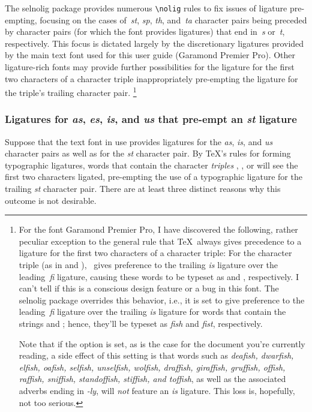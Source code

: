 \documentclass[11pt]{article}
\newcommand{\pkg}[1]{\textsf{#1}}
\newcommand{\opt}[1]{\uselig{\texttt{#1}}}
\newcommand{\cmmd}[1]{\texttt{\textbackslash #1}}
\begin{document}
\enlargethispage{0.5\baselineskip}

The \pkg{selnolig} package provides numerous \cmmd{nolig} rules to fix issues of ligature pre-empting, focusing on the cases of~\emph{st}, \emph{sp}, \emph{th}, and~\emph{ta} character pairs being preceded by character pairs (for which the font provides ligatures) that end in~\emph{s} or~\emph{t}, respectively. This focus is dictated largely by the discretionary ligatures provided by the main text font used for this user guide (Garamond Premier Pro). Other ligature-rich fonts may provide further possibilities for the ligature for the first two characters of a character triple inappropriately pre-empting the ligature for the triple's trailing character pair.%
\footnote{For the font Garamond Premier Pro, I have discovered the following, rather peculiar exception to the general rule that \TeX\ always gives precedence to a ligature for the first two characters of a character triple: For the character triple \opt{fis} (as in \opt{fist} and \opt{fish}), \LuaTeX\ gives preference to the trailing \emph{is} ligature over the leading\, \emph{fi} ligature, causing these words to be typeset as \emph{} and \emph{}, respectively. I can't tell if this is a conscious design feature or a bug in this font. The \pkg{selnolig} package overrides this behavior, i.e., it is set to give preference to the leading\, \emph{fi} ligature over the trailing \emph{is} ligature for words that contain the strings \opt{fist} and \opt{fish}; hence, they'll be typeset as \emph{fish} and \emph{fist}, respectively. 

Note that if the \opt{broadf} option is set, as is the case for the document you're currently reading, a side effect of this setting is that words such as \emph{deafish, dwarfish, elfish, oafish, selfish, unselfish, wolfish, draffish, giraffish, gruffish, offish, raffish, sniffish, standoffish, stiffish, \emph{and} toffish}, as well as the associated adverbs ending in \emph{-ly}, will \emph{not} feature an \emph{is} ligature. This loss is, hopefully, not too serious.}

\subsubsection*{Ligatures for \emph{as}, \emph{\ebg es},  \emph{is}, and \emph{us} that pre-empt an \emph{st} ligature}

Suppose that the text font in use provides ligatures for the \emph{as}, \emph{is}, and \emph{us} character pairs as well as for the \emph{st} character pair. By \TeX's rules for forming typographic ligatures, words that contain the character \emph{triples} \opt{ast}, \opt{ist}, or \opt{ust} will see the first two characters ligated, pre-empting the use of a typographic ligature for the trailing \emph{st} character pair. There are at least three distinct reasons why this outcome is not desirable.
\end{document}
